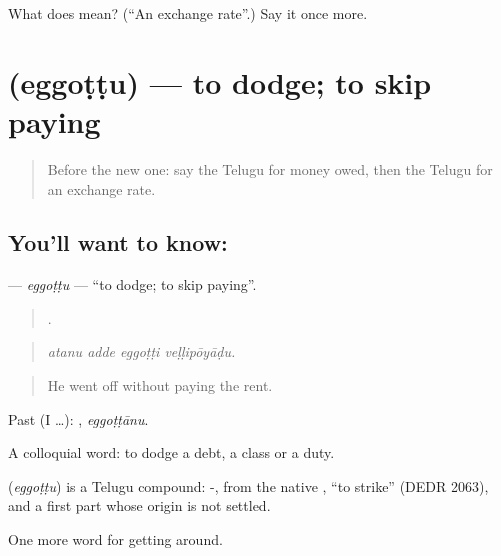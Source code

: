 \begin{tcolorbox}[breakable,colback=teal!4,colframe=teal!35!black,title={Before you move on}]
What does  mean? (\textquotedblleft{}An exchange rate\textquotedblright{}.) Say it once more.
\end{tcolorbox}
\section[\texorpdfstring{\te{ఎగ్గొట్టు} (eggoṭṭu)}{ఎగ్గొట్టు (eggoṭṭu)}]{ (eggoṭṭu) — to dodge; to skip paying}

\label{lesson:TE-C485-eggottu}



\begin{quote}
Before the new one: say the Telugu for money owed, then the Telugu for an exchange rate.
\end{quote}

\subsection*{You'll want to know: }
\textbf{} — \emph{eggoṭṭu} — \textquotedblleft{}to dodge; to skip paying\textquotedblright{}.

\begin{quote}
   .
\end{quote}

\begin{quote}
\emph{atanu adde eggoṭṭi veḷḷipōyāḍu.}
\end{quote}

\begin{quote}
He went off without paying the rent.
\end{quote}

Past (I …): , \emph{eggoṭṭānu}.

A colloquial word: to dodge a debt, a class or a duty.

\begin{cousinweb}
\textbf{} (\emph{eggoṭṭu}) is a Telugu compound: -, from the native , \textquotedblleft{}to strike\textquotedblright{} (DEDR 2063), and a first part whose origin is not settled.
\end{cousinweb}

\begin{grammarlens}[title={What you've built}]
One more word for getting around.
\end{grammarlens}

